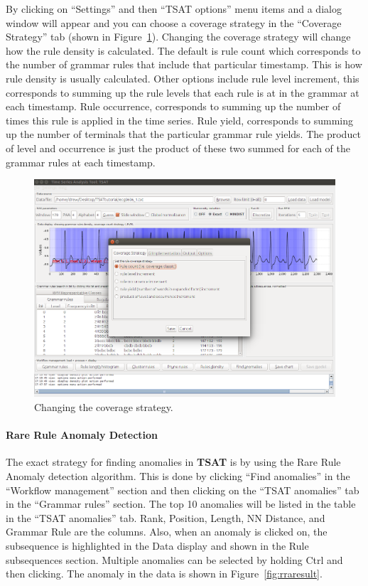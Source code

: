 \documentclass[titlepage, letterpaper, 12pt]{article}
\newcommand\TSAT{\textbf{TSAT}}
\begin{document}
By clicking on ``Settings'' and then ``TSAT options'' menu items and a dialog window will appear and you can choose a coverage strategy in the ``Coverage Strategy'' tab (shown in Figure~\ref{fig:coveragestrategy}). Changing the coverage strategy will change how the rule density is calculated. The default is rule count which corresponds to the number of grammar rules that include that particular timestamp.  This is how rule density is usually calculated.  Other options include rule level increment, this corresponds to summing up the rule levels that each rule is at in the grammar at each timestamp.  Rule occurrence, corresponds to summing up the number of times this rule is applied in the time series.   Rule yield, corresponds to summing up the number of terminals that the particular grammar rule yields.  The product of level and occurrence is just the product of these two summed for each of the grammar rules at each timestamp.

\begin{figure}[H]
	\centering
	\includegraphics[width=\textwidth]{pictures/motifguide/coveragestrategy}
	\caption{Changing the coverage strategy.}
	\label{fig:coveragestrategy}
\end{figure}

\paragraph{Rare Rule Anomaly Detection}

The exact strategy for finding anomalies in {\TSAT} is by using the Rare Rule Anomaly detection algorithm.  This is done by clicking ``Find anomalies'' in the ``Workflow management'' section and then clicking on the ``TSAT anomalies'' tab in the ``Grammar rules'' section.  The top 10 anomalies will be listed in the table in the ``TSAT anomalies'' tab.  Rank, Position, Length, NN Distance, and Grammar Rule are the columns.  Also, when an anomaly is clicked on, the subsequence is highlighted in the Data display and shown in the Rule subsequences section.  Multiple anomalies can be selected by holding Ctrl and then clicking.  The anomaly in the data is shown in Figure~\ref{fig:rraresult}.
\end{document}
